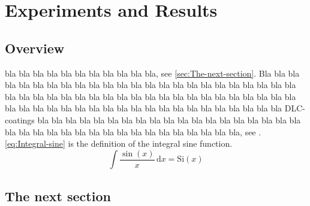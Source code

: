 
\chapter{Experiments and Results}


\section{Overview}

bla bla bla bla bla bla bla bla bla bla bla, see \ref{sec:The-next-section}.
Bla bla bla bla bla bla bla bla bla bla bla bla bla bla bla bla bla
bla bla bla bla bla bla bla bla bla bla bla bla bla bla bla bla bla
bla bla bla bla bla bla bla bla bla bla bla bla bla bla bla bla bla
bla bla bla bla bla bla bla bla bla bla bla bla bla bla DLC-coatings
bla bla bla bla bla bla bla bla b\cite{loser}la bla bla bla bla bla
bla bla bla bla bla bla bla bla bla bla bla bla bla bla bla bla bla
bla bla bla bla bla, see \cite{test1}. \eqref{eq:Integral-sine}
is the definition of the integral sine function. 
\begin{equation}
\int\frac{\sin(x)}{x}\,\mathrm{d}x=\mathrm{Si}(x)\label{eq:Integral-sine}
\end{equation}



\section{The next section\label{sec:The-next-section}}
